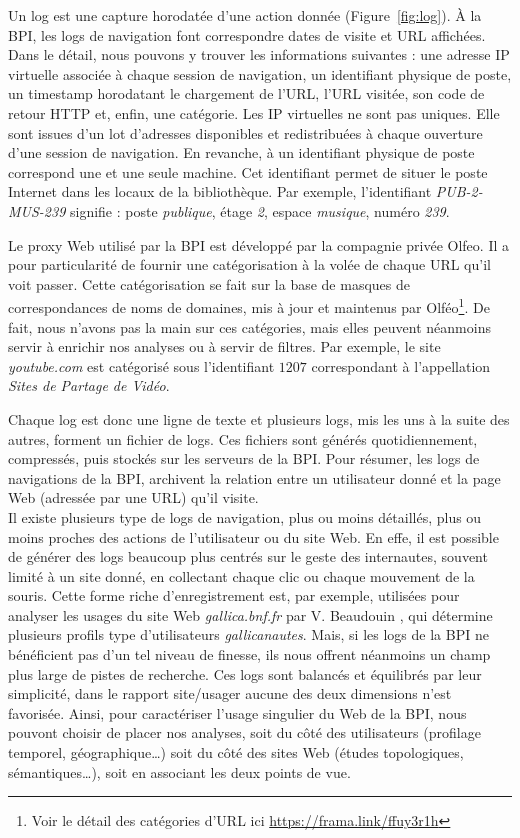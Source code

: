 \documentclass[symmetric,justified,marginals=raggedouter]{tufte-book}
\begin{document}
Un log est une capture horodatée d'une action donnée (Figure~\ref{fig:log}). À la BPI, les logs de navigation font correspondre dates de visite et URL affichées. Dans le détail, nous pouvons y trouver les informations suivantes : une adresse IP virtuelle associée à chaque session de navigation, un identifiant physique de poste, un timestamp horodatant le chargement de l'URL, l'URL visitée, son code de retour HTTP et, enfin, une catégorie. Les IP virtuelles ne sont pas uniques. Elle sont issues d'un lot d'adresses disponibles et redistribuées à chaque ouverture d'une session de navigation. En revanche, à un identifiant physique de poste correspond une et une seule machine. Cet identifiant permet de situer le poste Internet dans les locaux de la bibliothèque. Par exemple, l'identifiant \textit{PUB-2-MUS-239} signifie : poste \textit{publique}, étage \textit{2}, espace \textit{musique}, numéro \textit{239}.  

Le proxy Web utilisé par la BPI est développé par la compagnie privée Olfeo. Il a pour particularité de fournir une catégorisation à la volée de chaque URL qu'il voit passer. Cette catégorisation se fait sur la base de masques de correspondances de noms de domaines, mis à jour et maintenus par Olféo\footnote{\RaggedOuter Voir le détail des catégories d'URL ici \url{https://frama.link/ffuy3r1h}}. De fait, nous n'avons pas la main sur ces catégories, mais elles peuvent néanmoins servir à enrichir nos analyses ou à servir de filtres. Par exemple, le site \textit{youtube.com} est catégorisé sous l'identifiant $1207$ correspondant à l'appellation \textit{Sites de Partage de Vidéo}.

Chaque log est donc une ligne de texte et plusieurs logs, mis les uns à la suite des autres, forment un fichier de logs. Ces fichiers sont générés quotidiennement, compressés, puis stockés sur les serveurs de la BPI. Pour résumer, les logs de navigations de la BPI, archivent la relation entre un utilisateur donné et la page Web (adressée par une URL) qu'il visite. \\

\noindent Il existe plusieurs type de logs de navigation, plus ou moins détaillés, plus ou moins proches des actions de l'utilisateur ou du site Web. En effe, il est possible de générer des logs beaucoup plus centrés sur le geste des internautes, souvent limité à un site donné, en collectant chaque clic ou chaque mouvement de la souris. Cette forme riche d'enregistrement est, par exemple, utilisées pour analyser les usages du site Web \textit{gallica.bnf.fr} par V. Beaudouin \citep{beaudouin_observer_2014}, qui détermine plusieurs profils type d'utilisateurs \textit{gallicanautes}. Mais, si les logs de la BPI ne bénéficient pas d'un tel niveau de finesse, ils nous offrent néanmoins un champ plus large de pistes de recherche. Ces logs sont balancés et équilibrés par leur simplicité, dans le rapport site/usager aucune des deux dimensions n'est favorisée. Ainsi, pour caractériser l'usage singulier du Web de la BPI, nous pouvont choisir de placer nos analyses, soit du côté des utilisateurs (profilage temporel, géographique\ldots{}) soit du côté des sites Web (études topologiques, sémantiques\ldots{}), soit en associant les deux points de vue.
\end{document}
